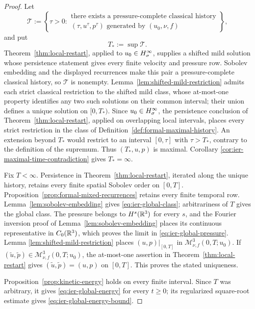 \begin{proof}
 Let
 \[
  \mathscr T:=\left\{\tau>0:
  \begin{array}{c}
  \text{there exists a pressure-complete classical history}\\
  (\tau,u^\tau,p^\tau)\text{ generated by }(u_0,\nu,f)
  \end{array}
  \right\},
 \]
 and put
\[
 T_*:=\sup\mathscr T.
\]
 Theorem~\ref{thm:local-restart}, applied to \(u_0\in H^\infty_\sigma\), supplies a
 shifted mild solution whose persistence statement gives every finite
 velocity and pressure row.  Sobolev embedding and the displayed recurrences
 make this pair a pressure-complete classical history, so \(\mathscr T\) is
 nonempty.
 Lemma~\ref{lem:shifted-mild-restriction} admits each strict classical
restriction to the shifted mild class, whose at-most-one property identifies
any two such solutions on their common interval; their union defines a unique
 solution on \([0,T_*)\).  Since \(u_0\in H^\infty_\sigma\), the persistence conclusion
of Theorem~\ref{thm:local-restart}, applied on overlapping local intervals,
places every strict restriction in the class of
Definition~\ref{def:formal-maximal-history}.  An extension beyond \(T_*\)
would restrict to an interval \([0,\tau]\) with \(\tau>T_*\), contrary to
the definition of the supremum.  Thus \((T_*,u,p)\) is maximal.  Corollary
\ref{cor:ier-maximal-time-contradiction} gives \(T_*=\infty\).

Fix \(T<\infty\).  Persistence in Theorem~\ref{thm:local-restart}, iterated
along the unique history, retains every finite spatial Sobolev order on
\([0,T]\).  Proposition~\ref{prop:formal-mixed-recurrences} retains every
finite temporal row.  Lemma~\ref{lem:sobolev-embedding} gives
\eqref{eq:ier-global-class}; arbitrariness of \(T\) gives the global class.
The pressure belongs to \(H^s(\mathbb R^3)\) for every \(s\), and the Fourier
inversion proof of Lemma~\ref{lem:sobolev-embedding} places its continuous
representative in \(C_0(\mathbb R^3)\), which proves the limit in
\eqref{eq:ier-global-pressure}.  Lemma
\ref{lem:shifted-mild-restriction} places \((u,p)|_{[0,T]}\) in
\(\mathscr M_{\nu,f}^3(0,T;u_0)\).  If
\((\widetilde u,\widetilde p)\in\mathscr M_{\nu,f}^3(0,T;u_0)\), the at-most-one
assertion in Theorem~\ref{thm:local-restart} gives
\((\widetilde u,\widetilde p)=(u,p)\) on \([0,T]\).  This proves the stated
uniqueness.

Proposition~\ref{prop:kinetic-energy} holds on every finite interval.  Since
\(T\) was arbitrary, it gives \eqref{eq:ier-global-energy} for every
\(t\ge0\); its regularized square-root estimate gives
\eqref{eq:ier-global-energy-bound}.
\end{proof}
